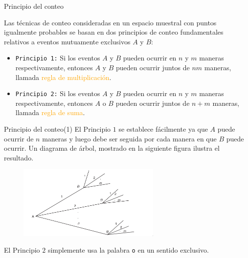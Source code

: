 \documentclass[10pt]{beamer}
\begin{document}
 \begin{frame}{Principio del conteo}
 	
Las t\'ecnicas de conteo consideradas en un espacio muestral con puntos igualmente probables  se basan en dos principios de conteo fundamentales relativos a  eventos mutuamente exclusivos $A$ y $B$:

\vspace{0.2cm}

 \begin{itemize}
 	\item \texttt{Principio 1:} Si los eventos $A$ y $B$ pueden ocurrir en $n$  y $m$ maneras respectivamente, entonces $A$ y $B$ pueden ocurrir juntos de $nm$ maneras, llamada \textcolor{orange}{regla de multiplicaci\'on}.
 	\item \texttt{Principio 2:} Si los eventos $A$ y $B$ pueden ocurrir en $n$  y $m$ maneras respectivamente, entonces $A$ o $B$ pueden ocurrir juntos de $n + m$ maneras, llamada \textcolor{orange}{regla de suma}.
 \end{itemize}


\end{frame}
\begin{frame}{Principio del conteo(1)}
El Principio $1$ se establece f\'acilmente ya que $A$ puede ocurrir de $n$ maneras y luego debe ser seguida por cada manera  en que $B$ puede ocurrir. Un diagrama de \'arbol, mostrado en la siguiente figura ilustra el resultado.

 \begin{figure}[h]
 	\centering
 	\includegraphics[width=7cm]{c1}
 \end{figure}
 
 \vspace{0.2cm}
 
El Principio $2$ simplemente usa la palabra \texttt{o} en un sentido exclusivo.

\end{frame}
\end{document}

